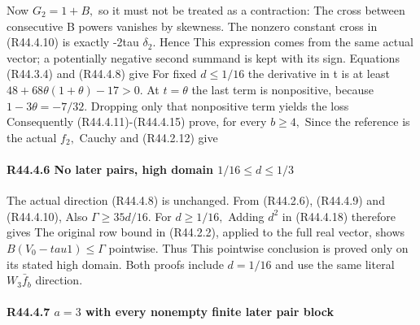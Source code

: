 Now \(G_2=1+B,\allowbreak \) so it must not be treated as a contraction:
The cross between consecutive B powers vanishes by skewness.
The nonzero constant cross in (R44.4.10) is exactly -2tau \(\delta_2.\)
Hence
This expression comes from the same actual vector; a potentially
negative second summand is kept with its sign. Equations (R44.3.4)
and (R44.4.8) give
For fixed \(d\le 1/16\) the derivative in t is at least
\(48+68\theta(1+\theta)-17>0.\) At \(t=\theta\) the last term is
nonpositive, because \(1-3\theta=-7/32.\) Dropping only that
nonpositive term yields the loss
Consequently (R44.4.11)-(R44.4.15) prove, for every \(b\ge 4,\allowbreak \)
Since the reference is the actual \(f_2,\allowbreak \) Cauchy and (R44.2.12) give

\paragraph{R44.4.6 No later pairs, high domain \(1/16\le d\le 1/3\)}

The actual direction (R44.4.8) is unchanged. From (R44.2.6), (R44.4.9)
and (R44.4.10),
Also \(\Gamma\ge 35d/16.\) For \(d\ge 1/16,\allowbreak \)
Adding \(d^2\) in (R44.4.18) therefore gives
The original row bound in (R44.2.2), applied to the full real vector,
shows \(B(V_0-tau1)\le \Gamma\) pointwise. Thus
This pointwise conclusion is proved only on its stated high
domain.  Both proofs include \(d=1/16\) and use the same
literal \(W_3 \bar f_b\) direction.

\paragraph{R44.4.7 \(a=3\) with every nonempty finite later pair block}

